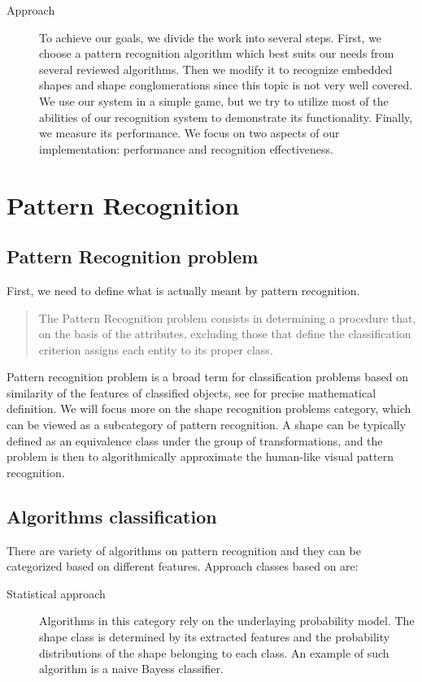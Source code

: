 \begin{description}
\begin{description}
\item [Approach]
To achieve our goals, we divide the work into several steps. First, we choose a pattern recognition algorithm which best suits our needs from several reviewed algorithms. Then we modify it to recognize embedded shapes and shape conglomerations since this topic is not very well covered. We use our system in a simple game, but we try to utilize most of the abilities of our recognition system to demonstrate its functionality. Finally, we measure its performance. We focus on two aspects of our implementation: performance and recognition effectiveness.

\end{description}

\chapter{Pattern Recognition}

\section{Pattern Recognition problem}
First, we need to define what is actually meant by pattern recognition. \begin{quotation}
The Pattern Recognition problem consists in determining a procedure that, on the basis of the attributes, excluding those that define the classification criterion assigns each entity to its proper class.
\end{quotation} \cite{formalMethods}
 Pattern recognition problem is a broad term for classification problems based on similarity of the features of classified objects, see \citet{formatMethods} for precise mathematical definition. We will focus more on the shape recognition problems category, which can be viewed as a subcategory of pattern recognition. A shape can be typically defined as an equivalence class under the group of transformations, and the problem is then to algorithmically approximate the human-like visual pattern recognition. 

\section{Algorithms classification}
There are variety of algorithms on pattern recognition and they can be categorized based on different features. Approach classes based on \citet{imageRecognition} are:
\begin{description}
\item [Statistical approach] Algorithms in this category rely on the underlaying probability model. The shape class is determined by its extracted features and the probability distributions of the shape belonging to each class. An example of such algorithm is a naive Bayess classifier.


\end{description}
\end{description}
